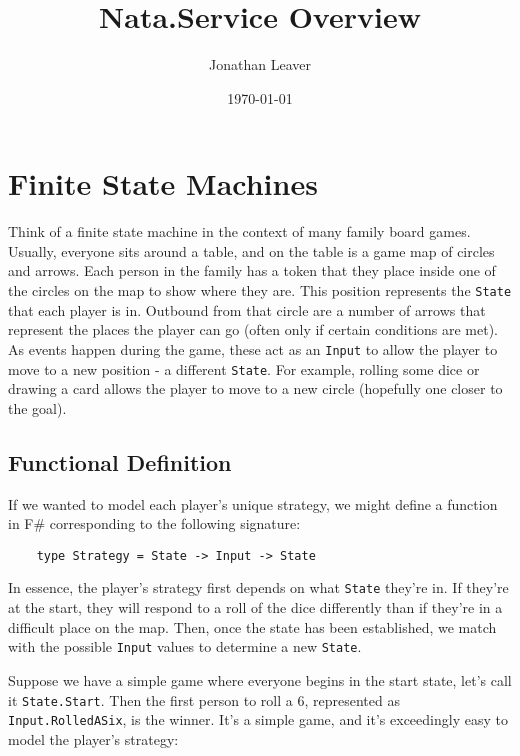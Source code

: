 \documentclass{article}
\begin{document}
\title{Nata.Service Overview}
\author{Jonathan Leaver}
\date{\today}

\maketitle
\thispagestyle{empty}
\tableofcontents

\clearpage
{}


\clearpage
\section{Finite State Machines}

Think of a finite state machine in the context of many family board games.  Usually, everyone sits around a table, and on the table is a game map of circles and arrows.  Each person in the family has a token that they place inside one of the circles on the map to show where they are.  This position represents the \texttt{State} that each player is in.  Outbound from that circle are a number of arrows that represent the places the player can go (often only if certain conditions are met).  As events happen during the game, these act as an \texttt{Input} to allow the player to move to a new position - a different \texttt{State}.  For example, rolling some dice or drawing a card allows the player to move to a new circle (hopefully one closer to the goal).

\subsection{Functional Definition}

If we wanted to model each player's unique strategy, we might define a function in F\# corresponding to the following signature:

\begin{verbatim}
    type Strategy = State -> Input -> State
\end{verbatim}

In essence, the player's strategy first depends on what \texttt{State} they're in.  If they're at the start, they will respond to a roll of the dice differently than if they're in a difficult place on the map. Then, once the state has been established, we match with the possible \texttt{Input} values to determine a new \texttt{State}.

Suppose we have a simple game where everyone begins in the start state, let's call it \texttt{State.Start}.  Then the first person to roll a 6, represented as \texttt{Input.RolledASix}, is the winner.  It's a simple game, and it's exceedingly easy to model the player's strategy:
\end{document}
